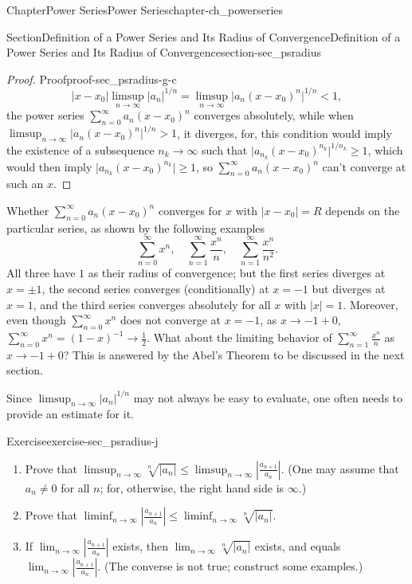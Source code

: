 \documentclass[oneside,10pt,]{book}
\numberwithin{equation}{section}
\newcommand{\lt}{<}
\newcommand{\gt}{>}
\begin{document}
\begin{chapterptx}{Chapter}{Power Series}{}{Power Series}{}{}{chapter-ch_powerseries}
\begin{sectionptx}{Section}{Definition of a Power Series and Its Radius of Convergence}{}{Definition of a Power Series and Its Radius of Convergence}{}{}{section-sec_psradius}
\begin{proof}{Proof}{}{proof-sec_psradius-g-c}
\begin{equation*}
\vert x-x_{0}\vert \limsup_{n\to\infty} \vert a_{n}\vert^{1/n}= \limsup_{n\to\infty} \vert a_{n}(x-x_{0})^{n}\vert^{1/n} \lt 1,
\end{equation*}
the power series \(\sum_{n=0}^{\infty} a_{n}(x-x_{0})^{n}\)  converges absolutely, while when  \(\limsup_{n\to\infty} \vert a_{n}(x-x_{0})^{n}\vert^{1/n} \gt 1\), it diverges, for, this condition would imply the existence of a subsequence \(n_{k}\to \infty\) such that \(\vert a_{n_{k}}(x-x_{0})^{n_{k}}\vert^{1/n_{k}}\ge 1\), which would then imply \(\vert a_{n_{k}}(x-x_{0})^{n_{k}}\vert \ge 1\), so \(\sum_{n=0}^{\infty} a_{n}(x-x_{0})^{n}\) can't converge at such an \(x\).\end{proof}
Whether  \(\sum_{n=0}^{\infty} a_{n}(x-x_{0})^{n}\) converges for \(x\) with \(|x-x_{0}|=R\) depends on the particular series, as shown by the following examples%
\begin{equation*}
\sum_{n=0}^{\infty} x^{n},\quad \sum_{n=1}^{\infty}\frac{x^{n}}{n},\quad \sum_{n=1}^{\infty}\frac{x^{n}}{n^{2}}.
\end{equation*}
All three have  \(1\) as their radius of convergence; but the first series diverges at \(x=\pm 1\), the second series converges (conditionally) at \(x=-1\) but diverges at \(x=1\), and the third series converges absolutely for all \(x\) with \(|x|=1\). Moreover, even though \(\sum_{n=0}^{\infty} x^{n}\) does not converge at \(x=-1\), as \(x\to -1+0\), \(\sum_{n=0}^{\infty} x^{n}=(1-x)^{-1}\to \frac 12\).  What about the limiting behavior of \(\sum_{n=1}^{\infty}\frac{x^{n}}{n}\) as \(x\to -1+0\)? This is answered by the Abel's Theorem to be discussed in the next section.%
\par
Since \(\limsup_{n\to\infty} \vert a_{n}\vert^{1/n}\) may not always be easy to evaluate, one often needs to provide an estimate for it.%
\begin{inlineexercise}{Exercise}{}{exercise-sec_psradius-j}%
%
\begin{enumerate}
\item{}Prove that \(\limsup_{n\to\infty} \sqrt[n]{|a_n|} \le  \limsup_{n\to \infty} |\frac{a_{n+1}}{a_n}|\). (One may assume that \(a_n \ne 0\) for all \(n\); for, otherwise, the right hand side is \(\infty\).)%
\item{}Prove that \(\liminf_{n\to \infty} |\frac{a_{n+1}}{a_n}| \le \liminf_{n\to\infty} \sqrt[n]{|a_n|}\).%
\item{}If \(\lim_{n\to \infty} |\frac{a_{n+1}}{a_n}|\) exists,  then \(\lim_{n\to\infty} \sqrt[n]{|a_n|}\) exists, and equals \(\lim_{n\to \infty} |\frac{a_{n+1}}{a_n}|\).  (The converse is not true; construct some examples.)%

\end{enumerate}
\end{inlineexercise}
\end{sectionptx}
\end{chapterptx}
\end{document}
